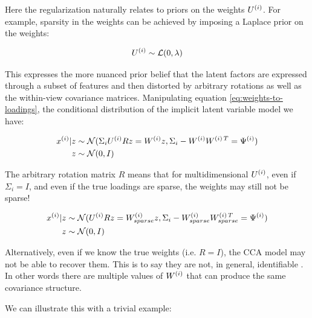 Here the regularization naturally relates to priors on the weights \(U^{(i)}\).
For example, sparsity in the weights can be achieved by imposing a Laplace prior on the weights:

\begin{align}
    U^{(i)} \sim \mathcal{L}(0, \lambda)
\end{align}

This expresses the more nuanced prior belief that the latent factors are expressed through a subset of features and then distorted by arbitrary rotations as well as the within-view covariance matrices.
Manipulating equation \ref{eq:weights-to-loadings}, the conditional distribution of the implicit latent variable model we have:

\begin{align}
    x^{(i)} | z &\sim \mathcal{N}(\Sigma_{i}U^{(i)}R z=W^{(i)}z, \Sigma_{i}-W^{(i)}W^{(i)\,T}=\Psi^{(i)}) \\
    z &\sim \mathcal{N}(0, I)
\end{align}

The arbitrary rotation matrix \(R\) means that for multidimensional $U^{(i)}$, even if $\Sigma_{i}=I$, and even if the true loadings are sparse, the weights may still not be sparse!

\begin{align}
    x^{(i)} | z &\sim \mathcal{N}(U^{(i)}R z=W_{sparse}^{(i)}z, \Sigma_{i}-W_{sparse}^{(i)}W_{sparse}^{(i)\,T}=\Psi^{(i)}) \\
    z &\sim \mathcal{N}(0, I)
\end{align}

Alternatively, even if we know the true weights (i.e. $R=I$), the CCA model may not be able to recover them.
This is to say they are not, in general, identifiable \citep{park2023critical}.
In other words there are multiple values of $W^{(i)}$ that can produce the same covariance structure.

We can illustrate this with a trivial example:

